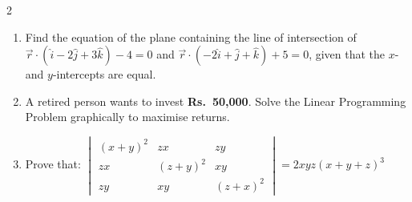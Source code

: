 \documentclass[12pt,a4paper]{article}
\begin{document}
\begin{multicols}{2}
\begin{enumerate}[label=\textbf{\arabic*.}, leftmargin=*, start=14]
\item Find the equation of the plane containing the line of intersection of  
$\vec r\cdot(\hat i-2\hat j+3\hat k)-4=0$  
and  
$\vec r\cdot(-2\hat i+\hat j+\hat k)+5=0$,  
given that the $x$- and $y$-intercepts are equal.

\item A retired person wants to invest \textbf{Rs.\ 50,000}.  
Solve the Linear Programming Problem graphically to maximise returns.

\item Prove that:  
$\displaystyle
\begin{vmatrix}
(x+y)^2 & zx & zy\\
zx & (z+y)^2 & xy\\
zy & xy & (z+x)^2
\end{vmatrix}
=2xyz(x+y+z)^3$

\end{enumerate}
\end{multicols}
\end{document}
